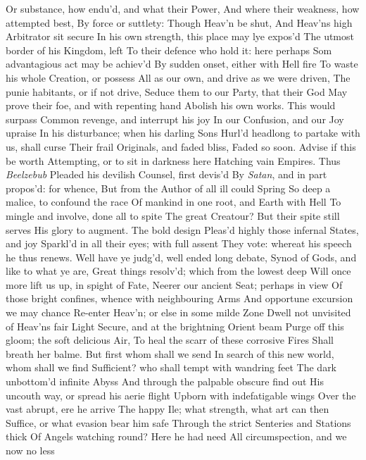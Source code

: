 \documentclass[11pt]{book}
\newcounter {first}
\begin{document}
Or substance, how endu'd, and what their Power, 
And where their weakness, how attempted best, 
By force or suttlety: Though Heav'n be shut, 
And Heav'ns high Arbitrator sit secure 
In his own strength, this place may lye expos'd 
The utmost border of his Kingdom, left 
To their defence who hold it: here perhaps 
Som advantagious act may be achiev'd 
By sudden onset, either with Hell fire 
To waste his whole Creation, or possess 
All as our own, and drive as we were driven, 
The punie habitants, or if not drive, 
Seduce them to our Party, that their God 
May prove their foe, and with repenting hand 
Abolish his own works.  This would surpass 
Common revenge, and interrupt his joy 
In our Confusion, and our Joy upraise 
In his disturbance; when his darling Sons 
Hurl'd headlong to partake with us, shall curse 
Their frail Originals, and faded bliss, 
Faded so soon.  Advise if this be worth 
Attempting, or to sit in darkness here 
Hatching vain Empires.  Thus \textit{Beelzebub} 
Pleaded his devilish Counsel, first devis'd 
By \textit{Satan}, and in part propos'd: for whence, 
But from the Author of all ill could Spring 
So deep a malice, to confound the race 
Of mankind in one root, and Earth with Hell 
To mingle and involve, done all to spite 
The great Creatour?  But their spite still serves 
His glory to augment.  The bold design 
Pleas'd highly those infernal States, and joy 
Sparkl'd in all their eyes; with full assent 
They vote: whereat his speech he thus renews. 
\quad Well have ye judg'd, well ended long debate, 
Synod of Gods, and like to what ye are, 
Great things resolv'd; which from the lowest deep 
Will once more lift us up, in spight of Fate, 
Neerer our ancient Seat; perhaps in view 
Of those bright confines, whence with neighbouring Arms 
And opportune excursion we may chance 
Re-enter Heav'n; or else in some milde Zone 
Dwell not unvisited of Heav'ns fair Light 
Secure, and at the brightning Orient beam 
Purge off this gloom; the soft delicious Air, 
To heal the scarr of these corrosive Fires 
Shall breath her balme.  But first whom shall we send 
In search of this new world, whom shall we find 
Sufficient? who shall tempt with wandring feet 
The dark unbottom'd infinite Abyss 
And through the palpable obscure find out 
His uncouth way, or spread his aerie flight 
Upborn with indefatigable wings 
Over the vast abrupt, ere he arrive 
The happy Ile; what strength, what art can then 
Suffice, or what evasion bear him safe 
Through the strict Senteries and Stations thick 
Of Angels watching round?  Here he had need 
All circumspection, and we now no less 
\end{document}
